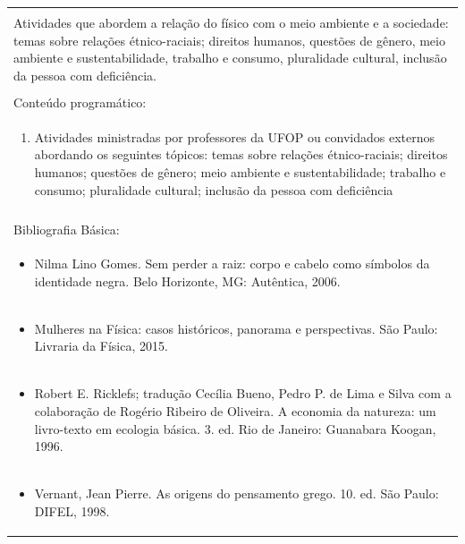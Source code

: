 \documentclass[11pt]{article}
\begin{document}
\begin{center}
\begin{longtable}{|p{4cm}|p{4cm}|p{4cm}|p{4cm}|}
\multicolumn{4}{|p{16cm}|}{}\\
\multicolumn{4}{|p{\dimexpr 16cm + 6\tabcolsep\relax}|}{Atividades que abordem a relação do físico com o meio ambiente e a sociedade: temas sobre relações étnico-raciais; direitos humanos, questões de gênero, meio ambiente e sustentabilidade, trabalho e consumo, pluralidade cultural, inclusão da pessoa com deficiência.}\\
\multicolumn{4}{|p{16cm}|}{}\\
\hline
\multicolumn{4}{|p{16cm}|}{Conteúdo programático:}\\*
\multicolumn{4}{|p{\dimexpr 16cm + 6\tabcolsep\relax}|}{\begin{enumerate}[start=1]\item Atividades ministradas por professores da UFOP ou convidados externos abordando os seguintes tópicos: temas sobre relações étnico-raciais; direitos humanos; questões de gênero; meio ambiente e sustentabilidade; trabalho e consumo; pluralidade cultural; inclusão da pessoa com deficiência\end{enumerate}}\\
\multicolumn{4}{|p{\dimexpr 16cm + 6\tabcolsep\relax}|}{}\\
\hline
\multicolumn{4}{|p{16cm}|}{Bibliografia Básica:}\\*
\multicolumn{4}{|p{\dimexpr 16cm + 6\tabcolsep\relax}|}{\begin{itemize}\item Nilma Lino Gomes. Sem perder a raiz: corpo e cabelo como símbolos da identidade negra. Belo Horizonte, MG: Autêntica, 2006.\end{itemize}}\\
\multicolumn{4}{|p{\dimexpr 16cm + 6\tabcolsep\relax}|}{\begin{itemize}\item Mulheres na Física: casos históricos, panorama e perspectivas. São Paulo: Livraria da Física, 2015.\end{itemize}}\\
\multicolumn{4}{|p{\dimexpr 16cm + 6\tabcolsep\relax}|}{\begin{itemize}\item Robert E. Ricklefs; tradução Cecília Bueno, Pedro P. de Lima e Silva com a colaboração de Rogério Ribeiro de Oliveira. A economia da natureza: um livro-texto em ecologia básica. 3. ed. Rio de Janeiro: Guanabara Koogan, 1996.\end{itemize}}\\
\multicolumn{4}{|p{\dimexpr 16cm + 6\tabcolsep\relax}|}{\begin{itemize}\item Vernant, Jean Pierre. As origens do pensamento grego. 10. ed. São Paulo: DIFEL, 1998.\end{itemize}}\\

\end{longtable}
\end{center}
\end{document}
